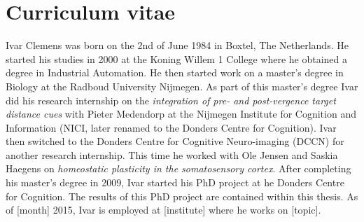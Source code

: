 \clearpage
\pagestyle{empty}

\chapter*{Curriculum vitae}
{}

Ivar Clemens was born on the 2nd of June 1984 in Boxtel, The Netherlands. He started his studies in 2000 at the Koning Willem 1 College where he obtained a degree in Industrial Automation. He then started work on a master's degree in Biology at the Radboud University Nijmegen. As part of this master's degree Ivar did his research internship on the \emph{integration of pre- and post-vergence target distance cues} with Pieter Medendorp at the Nijmegen Institute for Cognition and Information (NICI, later renamed to the Donders Centre for Cognition). Ivar then switched to the Donders Centre for Cognitive Neuro-imaging (DCCN) for another research internship. This time he worked with Ole Jensen and Saskia Haegens on \emph{homeostatic plasticity in the somatosensory cortex}. After completing his master's degree in 2009, Ivar started his PhD project at he Donders Centre for Cognition. The results of this PhD project are contained within this thesis. As of [month] 2015, Ivar is employed at [institute] where he works on [topic].
